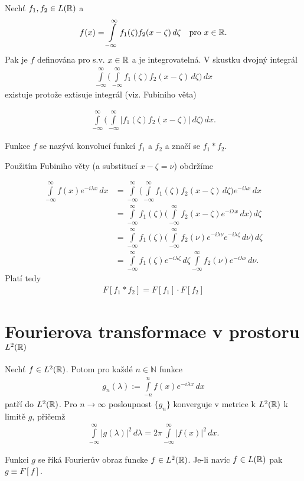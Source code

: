 Nechť $f_1,f_2 \in L(\mathbb{R})$ a 
\begin{align*}
f(x)=\int \limits _{-\infty}^{\infty} f_1(\zeta) f_2(x-\zeta) \, d\zeta \quad \text{pro $x \in \mathbb{R}$}.
\end{align*}
Pak je $f$ definována pro s.v. $x \in \mathbb{R}$ a je integrovatelná. V skustku dvojný integrál 
\begin{align*}
\int \limits _{-\infty}^{\infty} \Big(\int \limits _{-\infty}^{\infty} f_1(\zeta) f_2(x-\zeta) \, d\zeta \Big) \, dx
\end{align*}
existuje protože extisuje integrál (viz. Fubiniho věta)

\begin{align*}
\int \limits _{-\infty}^{\infty} \Big(\int \limits _{-\infty}^{\infty} |f_1(\zeta) f_2(x-\zeta)| \, d\zeta \Big) \, dx.
\end{align*}


Funkce $f$ se nazývá konvolucí funkcí $f_1$ a $f_2$ a značí se $f_1 * f_2$.

Použitím Fubiniho věty (a substitucí $x-\zeta=\nu$) obdržíme

\begin{align*}
\int \limits _{-\infty}^{\infty} f(x) e^{-i \lambda x } \, dx &= \int \limits  _{-\infty}^{\infty} \Big( \int \limits  _{-\infty}^{\infty} f_1(\zeta) f_2(x-\zeta) \, d \zeta \Big) e^{-i \lambda x} \, dx \\
&=\int \limits _{-\infty}^{\infty} f_1(\zeta) \Big(\int \limits _{-\infty}^{\infty} f_2(x-\zeta) e^{-i\lambda x} \, dx \Big) \, d\zeta \\
&=\int \limits _{-\infty}^{\infty} f_1(\zeta) \Big(\int \limits _{-\infty}^{\infty} f_2(\nu) e^{-i\lambda \nu} e^{-i\lambda \zeta} \, d \nu \Big) \, d\zeta \\
&=\int \limits _{-\infty}^{\infty} f_1(\zeta) e^{-i\lambda \zeta} \, d\zeta \int \limits _{-\infty}^{\infty} f_2(\nu) e^{-i\lambda \nu} \, d\nu.
\end{align*}
Platí tedy
\begin{align*}
F[f_1 * f_2] = F[f_1] \cdot F[f_2]
\end{align*}

\section{Fourierova transformace v prostoru \texorpdfstring{$L^2(\mathbb{R})$}{L2R}}

\begin{theorem}[Plancherel 1910]
Nechť $f \in L^2(\mathbb{R})$. Potom pro každé $n \in \mathbb{N}$ funkce 
\begin{align*}
g_n(\lambda):=\int \limits _{-n}^{n} f(x) e^{-i\lambda x} \, dx
\end{align*}
patří do $L^2(\mathbb{R})$. Pro $n \to \infty$ posloupnost $\{g_n\}$ konverguje v metrice k $L^2(\mathbb{R})$ k limitě $g$, přičemž
\begin{align*}
\int \limits _{-\infty}^{\infty} |g(\lambda)|^2 \, d \lambda = 2 \pi \int \limits _{-\infty}^{\infty} |f(x)|^2 \, dx.
\end{align*}

\end{theorem}


\begin{poznamka}
Funkci $g$ se říká Fourier\r uv obraz funcke $f \in L^2( \mathbb{R} )$. 
Je-li navíc $f \in L( \mathbb{R} )$ pak $g \equiv F[f]$.
\end{poznamka}



